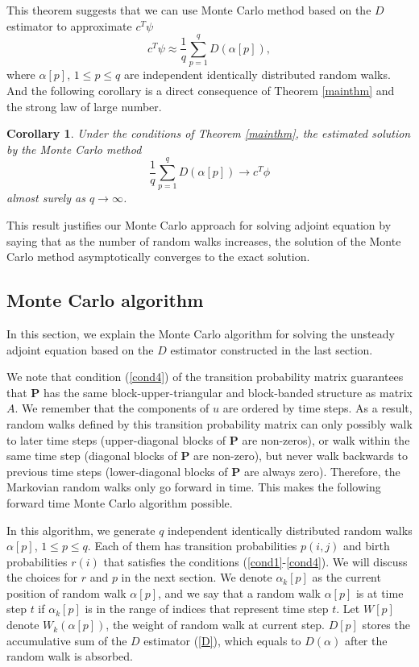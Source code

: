 \documentclass{elsart}
\newtheorem{corollary}[theorem]{Corollary}
\theoremstyle{remark}
\theoremstyle{definition}
\theoremstyle{proof}
\begin{document}
        This theorem suggests that we can use Monte Carlo method based on the
        $D$ estimator to approximate $c^T \psi$
        \[ c^T \psi \approx \frac1q \sum_{p=1}^q D(\alpha[p]), \]
        where $\alpha[p]$, $1\le p \le q$ are independent identically
        distributed random walks.  And the following corollary is a direct
        consequence of Theorem \ref{mainthm} and the strong law of large
        number.
        \begin{corollary}
            Under the conditions of Theorem \ref{mainthm}, the estimated
            solution by the Monte Carlo method
            \[ \frac1q \sum_{p=1}^q D(\alpha[p]) \to c^T \phi \]
            almost surely as $q\to\infty$.
        \end{corollary}
        This result justifies our Monte Carlo approach for solving adjoint
        equation by saying that as the number of random walks increases,
        the solution of the Monte Carlo method asymptotically converges to
        the exact solution.


    
    \subsection{Monte Carlo algorithm}
        In this section, we explain the Monte Carlo algorithm for solving the
        unsteady adjoint equation based on the $D$ estimator constructed in
        the last section.
        
        We note that condition (\ref{cond4}) of the transition probability
        matrix guarantees that $\mathbf{P}$ has the same block-upper-triangular
        and block-banded structure as matrix $A$. We remember that the
        components of $u$ are ordered by time steps. As a result, random
        walks defined by this transition probability matrix can only possibly
        walk to later time steps (upper-diagonal blocks of $\mathbf{P}$ are
        non-zeros), or walk within the same time step (diagonal blocks of
        $\mathbf{P}$ are non-zero), but never walk backwards to previous
        time steps (lower-diagonal blocks of $\mathbf{P}$ are always zero).
        Therefore, the Markovian random walks only go forward in time.
        This makes the following forward time Monte Carlo algorithm possible.
        
        In this algorithm, we generate $q$ independent identically
        distributed random walks $\alpha[p]$, $1\le p\le q$. Each of them
        has transition probabilities $p(i,j)$ and birth probabilities $r(i)$
        that satisfies the conditions (\ref{cond1}-\ref{cond4}). We will
        discuss the choices for $r$ and $p$ in the next section. We denote
        $\alpha_k[p]$ as the current position of random walk $\alpha[p]$,
        and we say that a random walk $\alpha[p]$ is at time step $t$ if
        $\alpha_k[p]$ is in the range of indices that represent time step
        $t$. Let $W[p]$ denote $W_k(\alpha[p])$, the weight of random walk
        at current step. $D[p]$ stores the accumulative sum of the $D$
        estimator (\ref{D}), which equals to $D(\alpha)$ after the random
        walk is absorbed.
        
\end{document}
